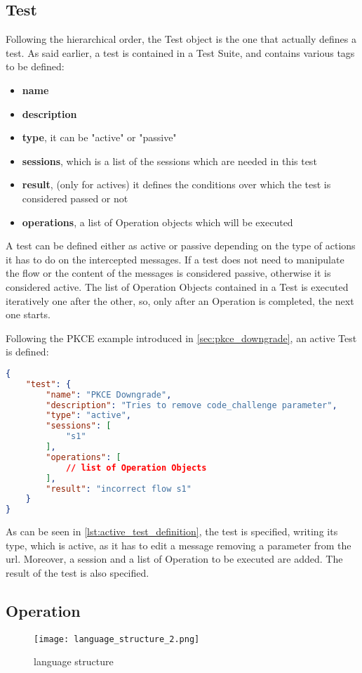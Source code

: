 \subsection{Test}
Following the hierarchical order, the Test object is the one that actually defines a test. As said earlier, a test is contained in a Test Suite, and contains various tags to be defined:
\begin{itemize}
    \item \textbf{name}
    \item \textbf{description}
    \item \textbf{type}, it can be "active" or "passive"
    \item \textbf{sessions}, which is a list of the sessions which are needed in this test
    \item \textbf{result}, (only for actives) it defines the conditions over which the test is considered passed or not
    \item \textbf{operations}, a list of Operation objects which will be executed
\end{itemize}
A test can be defined either as active or passive depending on the type of actions it has to do on the intercepted messages. If a test does not need to manipulate the flow or the content of the messages is considered passive, otherwise it is considered active.
The list of Operation Objects contained in a Test is executed iteratively one after the other, so, only after an Operation is completed, the next one starts.

Following the PKCE example introduced in \ref{sec:pkce_downgrade}, an active Test is defined:

\begin{lstlisting}[language=json, caption=Active test definition, label={lst:active_test_definition}]
{
    "test": {
        "name": "PKCE Downgrade",
        "description": "Tries to remove code_challenge parameter",
        "type": "active",
        "sessions": [
            "s1"
        ],
        "operations": [
            // list of Operation Objects
        ],
        "result": "incorrect flow s1"
    }
}    
\end{lstlisting}

As can be seen in \ref{lst:active_test_definition}, the test is specified, writing its type, which is active, as it has to edit a message removing a parameter from the url. Moreover, a session and a list of Operation to be executed are added. The result of the test is also specified.

\subsection{Operation}
\label{sec:operation}
\begin{wrapfigure}{r}{0.4\textwidth}
    \texttt{[image: language\_structure\_2.png]}
    \caption{language structure}
    \label{fig:language_structure_2}
\end{wrapfigure}

